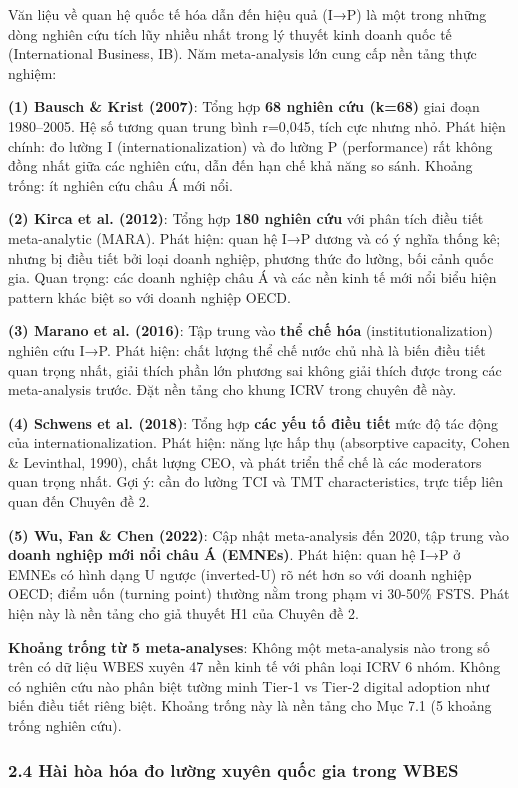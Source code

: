 \documentclass[12pt,a4paper]{article}
\begin{document}
Văn liệu về quan hệ quốc tế hóa dẫn đến hiệu quả (I→P) là một trong
những dòng nghiên cứu tích lũy nhiều nhất trong lý thuyết kinh doanh
quốc tế (International Business, IB). Năm meta-analysis lớn cung cấp nền
tảng thực nghiệm:

\textbf{(1) Bausch \& Krist (2007)}: Tổng hợp \textbf{68 nghiên cứu
(k=68)} giai đoạn 1980--2005. Hệ số tương quan trung bình r=0,045, tích
cực nhưng nhỏ. Phát hiện chính: đo lường I (internationalization) và đo
lường P (performance) rất không đồng nhất giữa các nghiên cứu, dẫn đến
hạn chế khả năng so sánh. Khoảng trống: ít nghiên cứu châu Á mới nổi.

\textbf{(2) Kirca et al. (2012)}: Tổng hợp \textbf{180 nghiên cứu} với
phân tích điều tiết meta-analytic (MARA). Phát hiện: quan hệ I→P dương
và có ý nghĩa thống kê; nhưng bị điều tiết bởi loại doanh nghiệp, phương
thức đo lường, bối cảnh quốc gia. Quan trọng: các doanh nghiệp châu Á và
các nền kinh tế mới nổi biểu hiện pattern khác biệt so với doanh nghiệp
OECD.

\textbf{(3) Marano et al. (2016)}: Tập trung vào \textbf{thể chế hóa}
(institutionalization) nghiên cứu I→P. Phát hiện: chất lượng thể chế
nước chủ nhà là biến điều tiết quan trọng nhất, giải thích phần lớn
phương sai không giải thích được trong các meta-analysis trước. Đặt nền
tảng cho khung ICRV trong chuyên đề này.

\textbf{(4) Schwens et al. (2018)}: Tổng hợp \textbf{các yếu tố điều
tiết} mức độ tác động của internationalization. Phát hiện: năng lực hấp
thụ (absorptive capacity, Cohen \& Levinthal, 1990), chất lượng CEO, và
phát triển thể chế là các moderators quan trọng nhất. Gợi ý: cần đo
lường TCI và TMT characteristics, trực tiếp liên quan đến Chuyên đề 2.

\textbf{(5) Wu, Fan \& Chen (2022)}: Cập nhật meta-analysis đến 2020,
tập trung vào \textbf{doanh nghiệp mới nổi châu Á (EMNEs)}. Phát hiện:
quan hệ I→P ở EMNEs có hình dạng U ngược (inverted-U) rõ nét hơn so với
doanh nghiệp OECD; điểm uốn (turning point) thường nằm trong phạm vi
30-50\% FSTS. Phát hiện này là nền tảng cho giả thuyết H1 của Chuyên đề
2.

\textbf{Khoảng trống từ 5 meta-analyses}: Không một meta-analysis nào
trong số trên có dữ liệu WBES xuyên 47 nền kinh tế với phân loại ICRV 6
nhóm. Không có nghiên cứu nào phân biệt tường minh Tier-1 vs Tier-2
digital adoption như biến điều tiết riêng biệt. Khoảng trống này là nền
tảng cho Mục 7.1 (5 khoảng trống nghiên cứu).

\hypertarget{24-huxe0i-huxf2a-huxf3a-ux111o-lux1b0ux1eddng-xuyuxean-quux1ed1c-gia-trong-wbes}{%
\subsubsection{2.4 Hài hòa hóa đo lường xuyên quốc gia trong
WBES}\label{24-huxe0i-huxf2a-huxf3a-ux111o-lux1b0ux1eddng-xuyuxean-quux1ed1c-gia-trong-wbes}}
\end{document}
